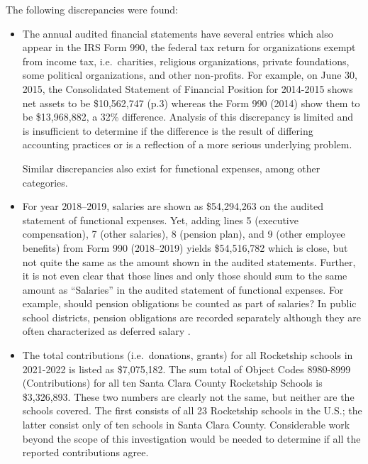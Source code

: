 The following discrepancies were found:
\begin{itemize}
  \item The annual audited financial statements have several entries which also appear in the IRS Form 990, the federal tax return for organizations exempt from income tax, i.e.\ charities, religious organizations, private foundations, some political organizations, and other non-profits. For example, on June 30, 2015, the Consolidated Statement of Financial Position for 2014-2015 shows net assets to be \$10,562,747 (p.3) whereas the Form 990 (2014) show them to be \$13,968,882, a 32\% difference. Analysis of this discrepancy is limited and is insufficient to determine if the difference is the result of differing accounting practices or is a reflection of a more serious underlying problem.

  Similar discrepancies also exist for functional expenses, among other categories.
 \item For year 2018–2019, salaries are shown as \$54,294,263 on the audited statement of functional expenses. Yet, adding lines 5 (executive compensation), 7 (other salaries), 8 (pension plan), and 9 (other employee benefits) from Form 990 (2018–2019) yields \$54,516,782 which is close, but not quite the same as the amount shown in the audited statements. Further, it is not even clear that those lines and only those should sum to the same amount as ``Salaries'' in the audited statement of functional expenses.  For example, should pension obligations be counted as part of salaries? In public school districts, pension obligations are recorded separately although they are often characterized as deferred salary \parencite{Kagan2022}. 

  \item The total contributions (i.e.\ donations, grants) for all Rocketship schools in 2021-2022 is listed as \$7,075,182. The sum total of Object Codes 8980-8999 (Contributions) for all ten Santa Clara County Rocketship Schools is \$3,326,893. These two numbers are clearly not the same, but neither are the schools covered. The first consists of all 23 Rocketship schools in the U.S.; the latter consist only of ten schools in Santa Clara County. Considerable work beyond the scope of this investigation would be needed to determine if all the reported contributions agree.


\end{itemize}
